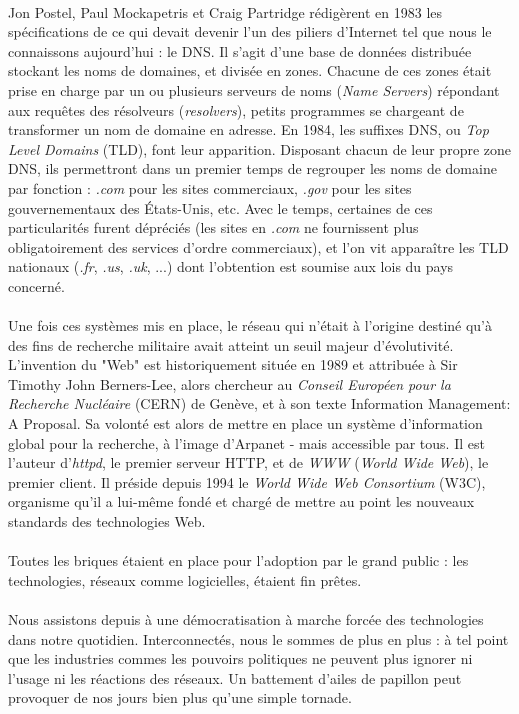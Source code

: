 \paragraph{} Jon Postel, Paul Mockapetris et Craig Partridge rédigèrent en 1983 les spécifications de ce qui devait 
devenir l'un des piliers d'Internet tel que nous le connaissons aujourd'hui : le DNS. Il s'agit d'une base de données
distribuée stockant les noms de domaines, et divisée en zones. Chacune de ces zones était prise en charge par un ou plusieurs
serveurs de noms (\emph{Name Servers}) répondant aux requêtes des résolveurs (\emph{resolvers}), petits programmes se
chargeant de transformer un nom de domaine en adresse. En 1984, les suffixes DNS, ou \emph{Top Level Domains} (TLD),
font leur apparition. Disposant chacun de leur propre zone DNS, ils permettront dans un premier temps de regrouper les
noms de domaine par fonction : \emph{.com} pour les sites commerciaux, \emph{.gov} pour les sites gouvernementaux des
États-Unis, etc. Avec le temps, certaines de ces particularités furent dépréciés (les sites en \emph{.com}
ne fournissent plus obligatoirement des services d'ordre commerciaux), et l'on vit apparaître les TLD nationaux (\emph{.fr},
\emph{.us}, \emph{.uk}, ...) dont l'obtention est soumise aux lois du pays concerné.

\paragraph{} Une fois ces systèmes mis en place, le réseau qui n'était à l'origine destiné qu'à des fins de recherche
militaire avait atteint un seuil majeur d'évolutivité. L'invention du "Web" est historiquement située en 1989 et
attribuée à Sir Timothy John Berners-Lee, alors chercheur au \emph{Conseil Européen pour la Recherche Nucléaire} (CERN)
de Genève, et à son texte \guillemotleft Information Management: A Proposal\guillemotright \cite{Internet1}. Sa volonté
est alors de mettre en place un système d'information global pour la recherche, à l'image d'Arpanet - mais accessible par tous.
Il est l'auteur d'\emph{httpd}, le premier serveur HTTP, et de \emph{WWW} (\emph{World Wide Web}), le premier client.
Il préside depuis 1994 le \emph{World Wide Web Consortium} (W3C), organisme qu'il a lui-même fondé et chargé de mettre
au point les nouveaux standards des technologies Web.

\paragraph{} Toutes les briques étaient en place pour l'adoption par le grand public : les technologies, réseaux comme
logicielles, étaient fin prêtes.

\paragraph{} Nous assistons depuis à une démocratisation à marche forcée des technologies dans notre quotidien. 
Interconnectés, nous le sommes de plus en plus : à tel point que les industries commes les pouvoirs politiques ne
peuvent plus ignorer ni l'usage ni les réactions des réseaux. Un battement d'ailes de papillon peut provoquer de nos
jours bien plus qu'une simple tornade.